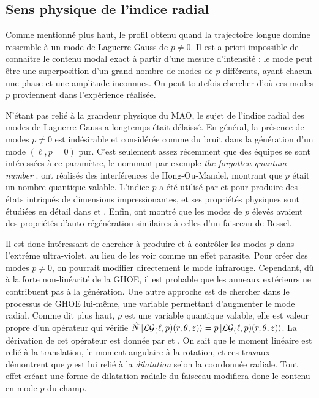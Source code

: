 \subsection{Sens physique de l'indice radial}
Comme mentionné plus haut, le profil obtenu quand la trajectoire longue domine ressemble à un mode de Laguerre-Gauss de $p\neq 0$. Il est a priori impossible de connaître le contenu modal exact à partir d'une mesure d'intensité : le mode peut être une superposition d'un grand nombre de modes de $p$ différents, ayant chacun une phase et une amplitude inconnues. On peut toutefois chercher d'où ces modes $p$ proviennent dans l'expérience réalisée.

N'étant pas relié à la grandeur physique du MAO, le sujet de l'indice radial des modes de Laguerre-Gauss a longtemps était délaissé. En général, la présence de modes $p\neq 0$ est indésirable et considérée comme du bruit dans la génération d'un mode $(\ell,p=0)$ pur. C'est seulement assez récemment que des équipes se sont intéressées à ce paramètre, le nommant par exemple \textit{the forgotten quantum number} .  ont réalisés des interférences de Hong-Ou-Mandel, montrant que $p$ était un nombre quantique valable. L'indice $p$ a été utilisé par  et  pour produire des états intriqués de dimensions impressionantes, et ses propriétés physiques sont étudiées en détail dans  et 	. Enfin,  ont montré que les modes de $p$ élevés avaient des propriétés d'auto-régénération similaires à celles d'un faisceau de Bessel. 

Il est donc intéressant de chercher à produire et à contrôler les modes $p$ dans l'extrême ultra-violet, au lieu de les voir comme un effet parasite. Pour créer des modes $p\neq 0$, on pourrait modifier directement le mode infrarouge. Cependant, dû à la forte non-linéarité de la GHOE, il est probable que les anneaux extérieurs ne contribuent pas à la génération. Une autre approche est de chercher dans le processus de GHOE lui-même, une variable permettant d'augmenter le mode radial. Comme dit plus haut, $p$ est une variable quantique valable, elle est valeur propre d'un opérateur qui vérifie $\hat{N}\ket{\mathcal{LG}_(\ell,p)(r,\theta,z)} = p\ket{\mathcal{LG}_(\ell,p)(r,\theta,z)}$. La dérivation de cet opérateur est donnée par  et . On sait que le moment linéaire est relié à la translation, le moment angulaire à la rotation, et ces travaux démontrent que $p$ est lui relié à la \textit{dilatation} selon la coordonnée radiale. Tout effet créant une forme de dilatation radiale du faisceau modifiera donc le contenu en mode $p$ du champ.

